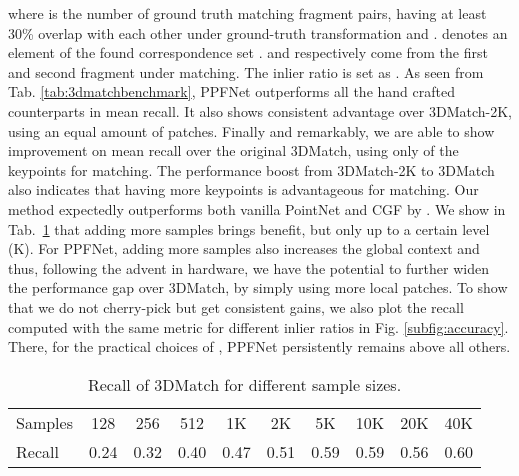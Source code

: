 \documentclass[10pt,twocolumn,letterpaper]{article}
\theoremstyle{break}
\begin{document}
where  is the number of ground truth matching fragment pairs, having at least 30\% overlap with each other under ground-truth transformation  and .  denotes an element of the found correspondence set .  and  respectively come from the first and second fragment under matching. The inlier ratio is set as .  
As seen from Tab. \ref{tab:3dmatchbenchmark}, PPFNet outperforms all the hand crafted counterparts in mean recall. It also shows consistent advantage over 3DMatch-2K, using an equal amount of patches. Finally and remarkably, we are able to show  improvement on mean recall over the original 3DMatch, using only  of the keypoints for matching. The performance boost from 3DMatch-2K to 3DMatch also indicates that having more keypoints is advantageous for matching. Our method expectedly outperforms both vanilla PointNet and CGF by . 
We show in Tab.~\ref{tab:recallVSsample} that adding more samples brings benefit, but only up to a certain level (K). For PPFNet, adding more samples also increases the global context and thus, following the advent in hardware, we have the potential to further widen the performance gap over 3DMatch, by simply using more local patches. 
To show that we do not cherry-pick  but get consistent gains,
we also plot the recall computed with the same metric for different inlier ratios in Fig. \ref{subfig:accuracy}. There, for the practical choices of , PPFNet persistently remains above all others.
\begin{table}[h!]
    \small
    \centering
    \caption{Recall of 3DMatch for different sample sizes.}
    \setlength\tabcolsep{3pt}
    \begin{tabular}{lccccccccc}
    \toprule
    Samples & 128   & 256   & 512   & 1K    & 2K    & 5K    & 10K   & 20K   & 40K \\
    Recall & 0.24 & 0.32 & 0.40 & 0.47 & 0.51 & 0.59 & 0.59 & 0.56 & 0.60 \\
    \bottomrule
    \end{tabular}\label{tab:recallVSsample}
\end{table}
\end{document}
